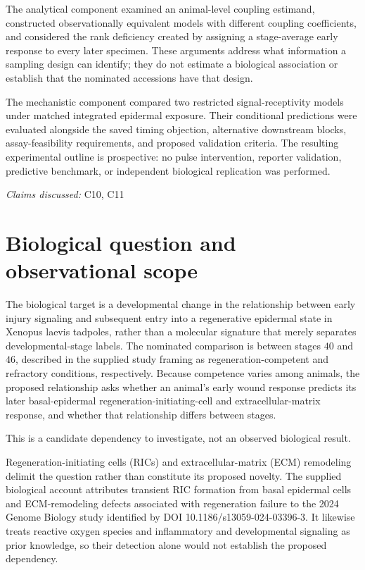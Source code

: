 \documentclass[11pt]{article}
\begin{document}
The analytical component examined an animal-level coupling estimand, constructed observationally equivalent models with different coupling coefficients, and considered the rank deficiency created by assigning a stage-average early response to every later specimen. These arguments address what information a sampling design can identify; they do not estimate a biological association or establish that the nominated accessions have that design.

The mechanistic component compared two restricted signal-receptivity models under matched integrated epidermal exposure. Their conditional predictions were evaluated alongside the saved timing objection, alternative downstream blocks, assay-feasibility requirements, and proposed validation criteria. The resulting experimental outline is prospective: no pulse intervention, reporter validation, predictive benchmark, or independent biological replication was performed.

\textit{Claims discussed: }C10, C11
\section{Biological question and observational scope}
The biological target is a developmental change in the relationship between early injury signaling and subsequent entry into a regenerative epidermal state in Xenopus laevis tadpoles, rather than a molecular signature that merely separates developmental-stage labels. The nominated comparison is between stages $40$ and $46$, described in the supplied study framing as regeneration-competent and refractory conditions, respectively. Because competence varies among animals, the proposed relationship asks whether an animal\textquoteright{}s early wound response predicts its later basal-epidermal regeneration-initiating-cell and extracellular-matrix response, and whether that relationship differs between stages.

This is a candidate dependency to investigate, not an observed biological result.

Regeneration-initiating cells (RICs) and extracellular-matrix (ECM) remodeling delimit the question rather than constitute its proposed novelty. The supplied biological account attributes transient RIC formation from basal epidermal cells and ECM-remodeling defects associated with regeneration failure to the 2024 Genome Biology study identified by DOI 10.1186/s13059-024-03396-3. It likewise treats reactive oxygen species and inflammatory and developmental signaling as prior knowledge, so their detection alone would not establish the proposed dependency.
\end{document}
